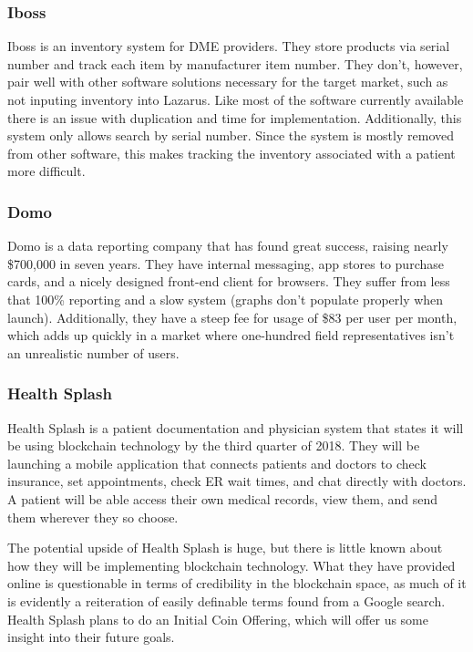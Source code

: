 \documentclass[12pt]{article}
\begin{document}
    \subsubsection{Iboss}
    Iboss is an inventory system for DME providers. They store products via serial number and track each item by manufacturer item number. They don’t, however, pair well with other software solutions necessary for the target market, such as not inputing inventory into Lazarus. Like most of the software currently available there is an issue with duplication and time for implementation. Additionally, this system only allows search by serial number. Since the system is mostly removed from other software, this makes tracking the inventory associated with a patient more difficult.

    \subsubsection{Domo}
    Domo is a data reporting company that has found great success, raising nearly \$700,000 in seven years. They have internal messaging, app stores to purchase cards, and a nicely designed front-end client for browsers. They suffer from less that 100\% reporting and a slow system (graphs don’t populate properly when launch). Additionally, they have a steep fee for usage of \$83 per user per month, which adds up quickly in a market where one-hundred field representatives isn’t an unrealistic number of users.

    \subsubsection{Health Splash}
    Health Splash is a patient documentation and physician system that states it will be using blockchain technology by the third quarter of 2018. They will be launching a mobile application that connects patients and doctors to check insurance, set appointments, check ER wait times, and chat directly with doctors. A patient will be able access their own medical records, view them, and send them wherever they so choose.

    The potential upside of Health Splash is huge, but there is little known about how they will be implementing blockchain technology. What they have provided online is questionable in terms of credibility in the blockchain space, as much of it is evidently a reiteration of easily definable terms found from a Google search. Health Splash plans to do an Initial Coin Offering, which will offer us some insight into their future goals.
\end{document}
